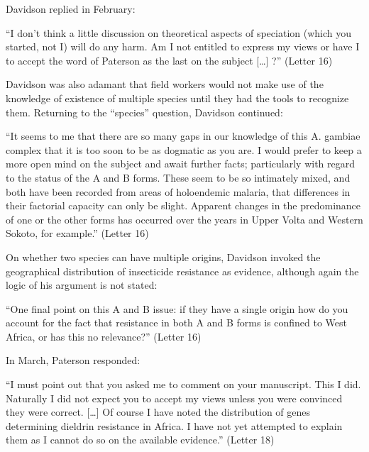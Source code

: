 \begin{refsection}
Davidson replied in February:


\begin{displayquote}
``I don't think a little discussion on theoretical aspects of speciation (which you started, not I) will do any harm. Am I not entitled to express my views or have I to accept the word of Paterson as the last on the subject [\ldots] ?'' (Letter 16)
\end{displayquote}


Davidson was also adamant that field workers would not make use of the knowledge of existence of multiple species until they had the tools to recognize them.
%
Returning to the ``species'' question, Davidson continued:


\begin{displayquote}
``It seems to me that there are so many gaps in our knowledge of this A. gambiae complex that it is too soon to be as dogmatic as you are. I would prefer to keep a more open mind on the subject and await further facts; particularly with regard to the status of the A and B forms. These seem to be so intimately mixed, and both have been recorded from areas of holoendemic malaria, that differences in their factorial capacity can only be slight. Apparent changes in the predominance of one or the other forms has occurred over the years in Upper Volta and Western Sokoto, for example.'' (Letter 16)
\end{displayquote}


On whether two species can have multiple origins, Davidson invoked the geographical distribution of insecticide resistance as evidence, although again the logic of his argument is not stated:


\begin{displayquote}
``One final point on this A and B issue: if they have a single origin how do you account for the fact that resistance in both A and B forms is confined to West Africa, or has this no relevance?'' (Letter 16)
\end{displayquote}


In March, Paterson responded:


\begin{displayquote}
``I must point out that you asked me to comment on your manuscript. This I did. Naturally I did not expect you to accept my views unless you were convinced they were correct. [\ldots] Of course I have noted the distribution of genes determining dieldrin resistance in Africa. I have not yet attempted to explain them as I cannot do so on the available evidence.'' (Letter 18)
\end{displayquote}



\end{refsection}
